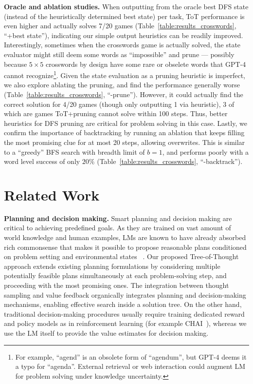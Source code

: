 \documentclass{article}
\begin{document}
\textbf{Oracle and ablation studies.} When outputting from the oracle best DFS state (instead of the heuristically determined best state) per task, ToT performance is even higher and actually solves 7/20 games (Table~\ref{table:results_crosswords}, ``+best state''), indicating our simple output heuristics can be readily improved. Interestingly, sometimes when the crosswords game is actually solved, the state evaluator might still deem some words as ``impossible'' and prune --- possibly because $5 \times 5$ crosswords by design have some rare or obselete words that GPT-4 cannot recognize\footnote{For example, ``agend'' is an obsolete form of ``agendum'', but GPT-4 deems it a typo for ``agenda''. External retrieval
or web interaction
could augment LM for problem solving under knowledge uncertainty.}. 
Given the state evaluation as a pruning heuristic is imperfect, we also explore ablating the pruning, and find the performance generally worse (Table~\ref{table:results_crosswords}, ``-prune''). However, it could actually find the correct solution for 4/20 games (though only outputting 1 via heuristic), 3 of which are games ToT+pruning cannot solve within 100 steps. Thus, better heuristics for DFS pruning are critical for problem solving in this case. 
Lastly, we confirm the importance of backtracking by running an ablation that keeps filling the most promising clue for at most 20 steps, allowing overwrites. This is similar to a ``greedy'' BFS search with breadth limit of $b=1$, and performs poorly with a word level success of only $20\%$ (Table~\ref{table:results_crosswords}, ``-backtrack''). 




\section{Related Work}

\textbf{Planning and decision making.} Smart planning and decision making are critical to achieving predefined goals. As they are trained on vast amount of world knowledge and human examples, 
LMs are known to have already absorbed rich commonsense that makes it possible to propose reasonable plans conditioned on problem setting and environmental states ~\citep{huang2022language,zhang2023planning,wang2023describe,inner2022huang,wang2023planandsolve,yao2022react,yang2023foundation}. Our proposed Tree-of-Thought approach extends existing planning formulations by considering multiple potentially feasible plans simultaneously at each problem-solving step, and proceeding with the most promising ones. The integration between thought sampling and value feedback organically integrates planning and decision-making mechanisms, enabling effective search inside a solution tree. On the other hand, traditional decision-making procedures usually require training dedicated reward and policy models as in reinforcement learning (for example CHAI~\citep{verma2022chai}), whereas we use the LM itself to provide the value estimates for decision making.
\end{document}
